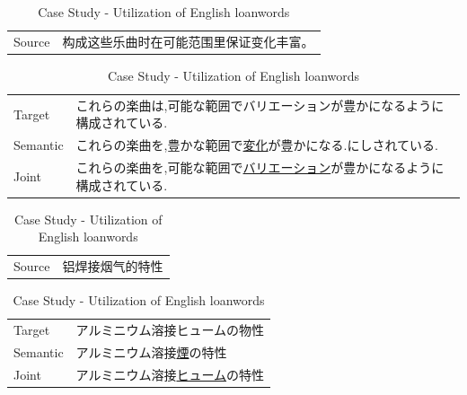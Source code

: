 \vspace{0.15cm}
\begin{table}[h]
    \centering

    \begin{CJK}{UTF8}{gbsn}
        \begin{tabularx}{\textwidth}{p{1.2cm}b}\toprule
            Source & 构成这些乐曲时在可能范围里保证变化丰富。 \\
        \end{tabularx}
    \end{CJK}

    \begin{CJK}{UTF8}{ipxm}
        \begin{tabularx}{\textwidth}{p{1.2cm}b}
            Target & これらの楽曲は,可能な範囲でバリエーションが豊かになるように構成されている. \\
            Semantic & これらの楽曲を,豊かな範囲で\underline{変化}が豊かになる.にしされている. \\
            Joint & これらの楽曲を,可能な範囲で\underline{バリエーション}が豊かになるように構成されている. \\\midrule
        \end{tabularx}
    \end{CJK}

    \begin{CJK}{UTF8}{gbsn}
        \begin{tabularx}{\textwidth}{p{1.2cm}b}
            Source & 铝焊接烟气的特性 \\
        \end{tabularx}
    \end{CJK}

    \begin{CJK}{UTF8}{ipxm}
        \begin{tabularx}{\textwidth}{p{1.2cm}b}
            Target & アルミニウム溶接ヒュームの物性 \\
            Semantic & アルミニウム溶接\underline{煙}の特性 \\
            Joint & アルミニウム溶接\underline{ヒューム}の特性 \\\midrule
        \end{tabularx}
    \end{CJK}
    \caption{Case Study - Utilization of English loanwords}
    \label{tab:case_study2}
\end{table}

